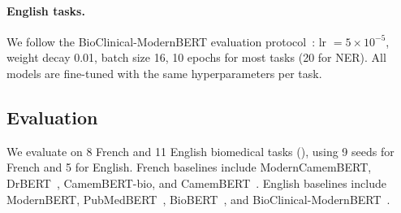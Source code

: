 \paragraph{English tasks.} We follow the BioClinical-ModernBERT evaluation protocol~\citep{sounack2025bioclinicalmodernbert}: lr $= 5 \times 10^{-5}$, weight decay 0.01, batch size 16, 10 epochs for most tasks (20 for NER). All models are fine-tuned with the same hyperparameters per task.

\subsection{Evaluation}

\begin{reviewread}
We evaluate on 8 French and 11 English biomedical tasks (), using 9 seeds for French and 5 for English. French baselines include ModernCamemBERT, DrBERT~\citep{labrak2023drbert}, CamemBERT-bio, and CamemBERT~\citep{martin-etal-2020-camembert}. English baselines include ModernBERT, PubMedBERT~\citep{gu_domain-specific_2022}, BioBERT~\citep{lee_biobert_2019}, and BioClinical-ModernBERT~\citep{sounack2025bioclinicalmodernbert}.
\end{reviewread}

